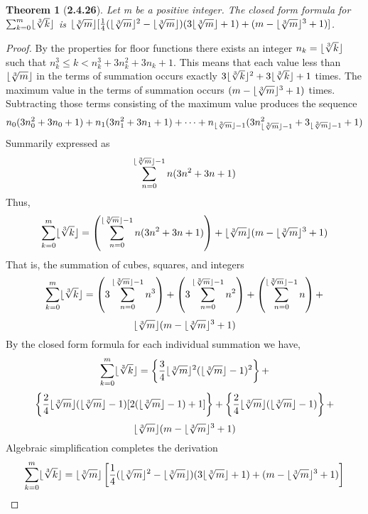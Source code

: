 \documentclass[a4paper, 12pt]{article}
\theoremstyle{plain}
\newtheorem*{theorem*}{Theorem}
\DeclarePairedDelimiter{\floor}{\lfloor}{\rfloor}
\begin{document}
	
\begin{theorem*}[\textbf{2.4.26}]
    Let m be a positive integer. The closed form formula for $\sum_{k=0}^{m} \floor{\sqrt[3]{k}}$ 
    is $\floor{\sqrt[3]{m}}
    [\frac{1}{4}(\floor{\sqrt[3]{m}}^{2} - \floor{\sqrt[3]{m}})(3\floor{\sqrt[3]{m}}+1)+
    (m - \floor{\sqrt[3]{m}}^{3} + 1)]$.
\end{theorem*}

\begin{proof}
    By the properties for floor functions there exists an integer $n_k = \floor{\sqrt[3]{k}}$ such 
    that $n_{k}^{3} \le k < n_{k}^{3} + 3n_{k}^{2} + 3n_k + 1$. This means that each value less 
    than $\floor{\sqrt[3]{m}}$ in the terms of summation occurs exactly 
    $3\floor{\sqrt[3]{k}}^{2} + 3\floor{\sqrt[3]{k}} + 1$ times. The maximum value in the terms of 
    summation occurs $(m - \floor{\sqrt[3]{m}}^{3} + 1)$ times. Subtracting those terms consisting 
    of the maximum value produces the sequence
    $$n_0(3n_{0}^{2} + 3n_0 + 1) + 
    n_1(3n_{1}^{2} + 3n_{1} + 1) + 
    \dots +
    n_{\floor{\sqrt[3]{m}} - 1}
    (3n_{\floor{\sqrt[3]{m}}-1}^{2} + 3_{\floor{\sqrt[3]{m}}-1} + 1)$$
    Summarily expressed as
    $$\sum_{n=0}^{\floor{\sqrt[3]{m}}-1} n(3n^2 + 3n + 1)$$
    Thus,
    $$\sum_{k=0}^{m} \floor{\sqrt[3]{k}} = 
    \left(\sum_{n=0}^{\floor{\sqrt[3]{m}}-1} n(3n^{2} + 3n + 1)\right) + 
    \floor{\sqrt[3]{m}}(m - \floor{\sqrt[3]{m}}^{3} + 1)$$ 
    That is, the summation of cubes, squares, and integers
    $$\sum_{k=0}^{m} \floor{\sqrt[3]{k}} =
    \left(3\sum_{n=0}^{\floor{\sqrt[3]{m}}-1} n^{3}\right) + 
    \left(3\sum_{n=0}^{\floor{\sqrt[3]{m}}-1} n^{2}\right) + 
    \left(\sum_{n=0}^{\floor{\sqrt[3]{m}}-1} n\right) +$$
    $$\floor{\sqrt[3]{m}}(m - \floor{\sqrt[3]{m}}^{3} + 1)$$
    By the closed form formula for each individual summation we have, 
    $$\sum_{k=0}^{m} \floor{\sqrt[3]{k}} = 
    \left\{\frac{3}{4}\floor{\sqrt[3]{m}}^{2}(\floor{\sqrt[3]{m}}-1)^{2}\right\} +$$
    $$\left\{
        \frac{2}{4}\floor{\sqrt[3]{m}}(\floor{\sqrt[3]{m}}-1)[2(\floor{\sqrt[3]{m}}-1) +1]
    \right\} +
    \left\{\frac{2}{4}\floor{\sqrt[3]{m}}(\floor{\sqrt[3]{m}}-1)\right\} +$$
    $$\floor{\sqrt[3]{m}}(m - \floor{\sqrt[3]{m}}^{3} + 1)$$
    Algebraic simplification completes the derivation
    $$\sum_{k=0}^{m} \floor{\sqrt[3]{k}} =
    \floor{\sqrt[3]{m}}
    \left[
        \frac{1}{4}(\floor{\sqrt[3]{m}}^{2} - \floor{\sqrt[3]{m}})
        (3\floor{\sqrt[3]{m}}+1)+(m - \floor{\sqrt[3]{m}}^{3} + 1)
    \right]$$
\end{proof}
\end{document}
